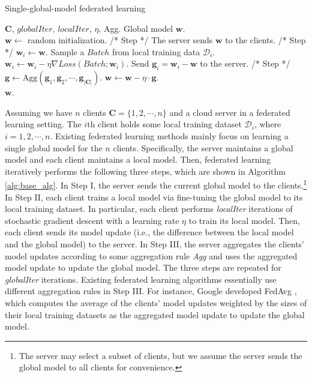 \documentclass[letterpaper]{article} %
\newcommand{\RomanNumeralCaps}[1]
    {\MakeUppercase{\romannumeral #1}}
\begin{document}
\begin{algorithm}[t]
	\caption{Single-global-model federated learning}\label{alg:base_alg}
	\begin{algorithmic}[1]
		 $\mathbf{C}$, $globalIter$, $localIter$, $\eta$, Agg.
     Global model $\mathbf{w}$.\\
		\STATE $\mathbf{w} \leftarrow $ random initialization.
		    \STATE /* Step \RomanNumeralCaps{1} */ 
		    \STATE The server sends $\mathbf{w}$ to the clients.
	        \STATE /* Step \RomanNumeralCaps{2} */ 
		        \STATE $\mathbf{w}_i \leftarrow \mathbf{w}$.
		            \STATE Sample a $Batch$ from local training data $\mathcal{D}_i$.
		            \STATE $\mathbf{w}_i \leftarrow \mathbf{w}_i - \eta \nabla Loss(Batch;\mathbf{w}_i)$.
		        \ENDFOR
	            \STATE Send $\mathbf{g}_i=\mathbf{w}_i-\mathbf{w}$ to the server.
		    \ENDFOR
		    \STATE /* Step \RomanNumeralCaps{3} */ 
            \STATE $\mathbf{g} \leftarrow \text{Agg}(\mathbf{g}_1, \mathbf{g}_2, \cdots, \mathbf{g}_{|\mathbf{C}|})$.
            \STATE $\mathbf{w} \leftarrow \mathbf{w} - \eta\cdot \mathbf{g}$.
		\ENDFOR\\
		\RETURN $\mathbf{w}$.
	\end{algorithmic} 
\end{algorithm}

Assuming we have $n$ clients $\mathbf{C}=\{1,2,\cdots,n\}$ and a cloud server in a federated learning setting. The $i$th client holds some local training dataset $\mathcal{D}_i$, where $i=1,2,\cdots,n$. Existing federated learning methods \cite{konevcny2016federated,mcmahan2016communication,wang2020federated,li2019convergence} mainly focus on learning a single global model for the $n$ clients. 
Specifically, the server maintains a global model and each client maintains a local model. Then, federated learning iteratively performs the following three steps, which are shown in Algorithm \ref{alg:base_alg}. In Step I, the server sends the current global model to the clients.\footnote{The server may select a subset of clients, but we assume the server sends the global model to all clients for convenience.} In Step II, each client trains a local model via fine-tuning the global model to its local training dataset. In particular, each client performs \emph{localIter} iterations of stochastic gradient descent with a learning rate $\eta$ to train its local model. Then, each client sends its model update (i.e., the difference between the local model and the global model) to the server. In Step III, the server aggregates the clients' model updates according to some aggregation rule \emph{Agg} and uses the aggregated model update to update the global model. The three steps are repeated for \emph{globalIter} iterations. Existing federated learning algorithms essentially use different aggregation rules in Step III. For instance, Google developed FedAvg \cite{mcmahan2016communication}, which computes the average of the clients' model updates weighted by the sizes of their local training datasets as the aggregated model update  to update the global model. 
\end{document}
